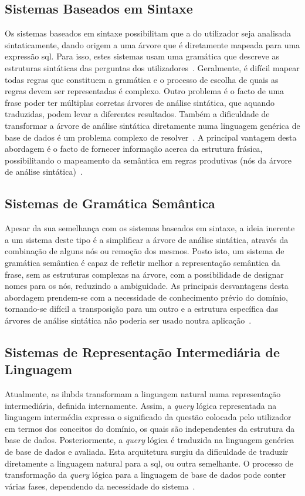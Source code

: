 \subsection{Sistemas Baseados em Sintaxe}
Os sistemas baseados em sintaxe possibilitam que a  do utilizador seja analisada sintaticamente, dando origem a uma árvore que é diretamente mapeada para uma expressão \gls{sql}. Para isso, estes sistemas usam uma gramática que descreve as estruturas sintáticas das perguntas dos utilizadores~\parencite{nlidb_brief_review}. Geralmente, é difícil mapear todas regras que constituem a gramática e o processo de escolha de quais as regras devem ser representadas é complexo. Outro problema é o facto de uma frase poder ter múltiplas corretas árvores de análise sintática, que aquando traduzidas, podem levar a diferentes resultados. Também a dificuldade de transformar a árvore de análise sintática diretamente numa linguagem genérica de base de dados é um problema complexo de resolver~\parencite{survey_nlidb}. A principal vantagem desta abordagem é o facto de fornecer informação acerca da estrutura frásica, possibilitando o mapeamento da semântica em regras produtivas (nós da árvore de análise sintática)~\parencite{nlidb_brief_review}.

\subsection{Sistemas de Gramática Semântica}
Apesar da sua semelhança com os sistemas baseados em sintaxe, a ideia inerente a um sistema deste tipo é a simplificar a árvore de análise sintática, através da combinação de alguns nós ou remoção dos mesmos. Posto isto, um sistema de gramática semântica é capaz de refletir melhor a representação semântica da frase, sem as estruturas complexas na árvore, com a possibilidade de designar nomes para os nós, reduzindo a ambiguidade. As principais desvantagens desta abordagem prendem-se com a necessidade de conhecimento prévio do domínio, tornando-se difícil a transposição para um outro e a estrutura específica das árvores de análise sintática não poderia ser usado noutra aplicação~\parencite{survey_nlidb, nlidb_brief_review}.

\subsection{Sistemas de Representação Intermediária de Linguagem}
Atualmente, as \glspl{ilnbd} transformam a linguagem natural numa representação intermediária, definida internamente. Assim, a \textit{query} lógica representada na linguagem intermédia expressa o significado da questão colocada pelo utilizador em termos dos conceitos do domínio, os quais são independentes da estrutura da base de dados. Posteriormente, a \textit{query} lógica é traduzida na linguagem genérica de base de dados e avaliada. Esta arquitetura surgiu da dificuldade de traduzir diretamente a linguagem natural para a \gls{sql}, ou outra semelhante. O processo de transformação da \textit{query} lógica para a linguagem de base de dados pode conter várias fases, dependendo da necessidade do sistema~\parencite{nlidb_brief_review}.

